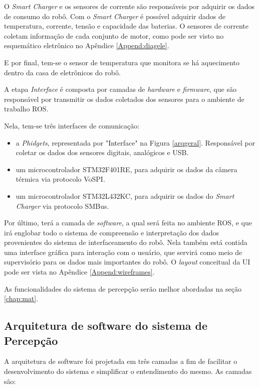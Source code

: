 O \textit{Smart Charger} e os sensores de corrente são responsáveis por adquirir os dados de consumo do robô. Com o \textit{Smart Charger} é possível adquirir dados de temperatura, corrente, tensão e capacidade das baterias. O sensores de corrente coletam informação de cada conjunto de motor, como pode ser visto no esquemático eletrônico no Apêndice \ref{Append:diagele}.

E por final, tem-se o sensor de temperatura que monitora se há aquecimento dentro da casa de eletrônicos do robô.
  
A etapa \textit{Interface} é composta por camadas de \textit{hardware} e \textit{firmware}, que são responsável por transmitir os dados coletados dos sensores para o ambiente de trabalho ROS.

Nela, tem-se três interfaces de comunicação: 

\begin{itemize}
	\item a \textit{Phidgets}, representada por "Interface" na Figura \ref{arqgeral}. Responsável por coletar os dados dos sensores digitais, analógicos e USB.
	\item um microcontrolador STM32F401RE, para adquirir os dados da câmera térmica via protocolo VoSPI.
	\item um microcontrolador STM32L432KC, para adquirir os dados do \textit{Smart Charger} via protocolo SMBus.
\end{itemize}
 
 
 Por último, terá a camada de \textit{software}, a qual será feita no ambiente ROS, e que irá englobar todo o sistema de compreensão e interpretação dos dados provenientes do sistema de interfaceamento do robô. Nela também está contida uma interface gráfica para interação com o usuário, que servirá como meio de supervisório para os dados mais importantes do robô. O \textit{layout} conceitual da UI pode ser vista no Apêndice \ref{Append:wireframes}. 
 
 As funcionalidades do sistema de percepção serão melhor abordadas na seção \ref{chap:mat}.
 

\subsection{Arquitetura de software do sistema de Percepção}
\label{ssec:arqsp}


A arquitetura de software foi projetada em três camadas a fim de facilitar o desenvolvimento do sistema e simplificar o entendimento do mesmo. As camadas são:

